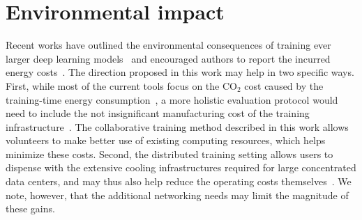 \section{Environmental impact} 
\label{appendix:env_impact}
Recent works have outlined the environmental consequences of training ever larger deep learning models~\cite{Strubell2019EnergyAP,Schwartz2020GreenA} and encouraged authors to report the incurred energy costs~\cite{Henderson2020TowardsTS}. The direction proposed in this work may help in two specific ways. First, while most of the current tools focus on the CO$_2$ cost caused by the training-time energy consumption~\cite{Anthony2020CarbontrackerTA}, a more holistic evaluation protocol would need to include the not insignificant manufacturing cost of the training infrastructure~\cite{Kline2016HolisticallyET,Bashroush2018ACR}. The collaborative training method described in this work allows volunteers to make better use of existing computing resources, which helps minimize these costs. Second, the distributed training setting allows users to dispense with the extensive cooling infrastructures required for large concentrated data centers, and may thus also help reduce the operating costs themselves~\cite{Qiu2020CanFL}. We note, however, that the additional networking needs may limit the magnitude of these gains.